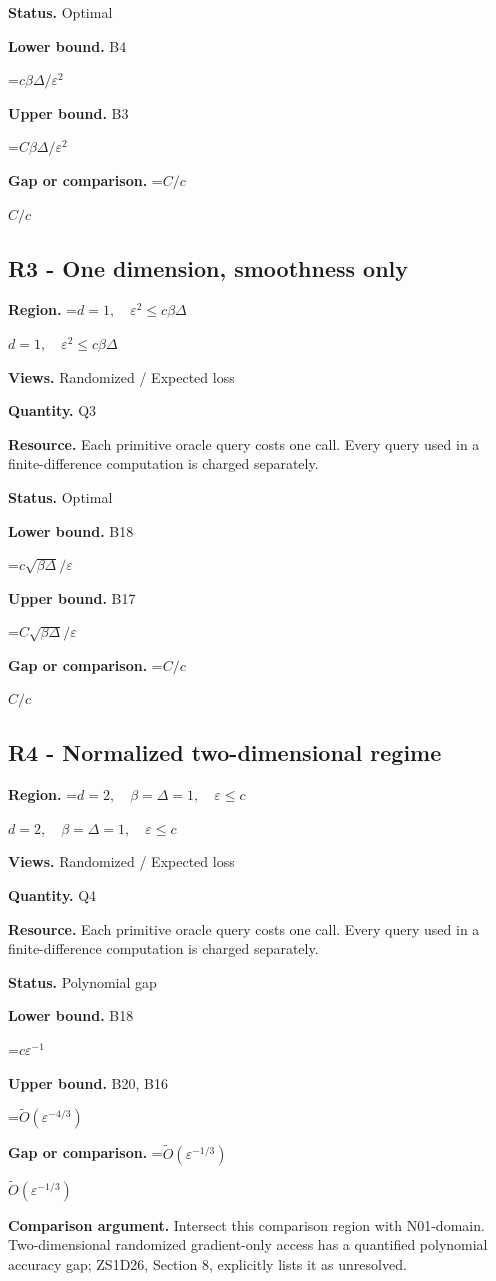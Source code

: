 \documentclass[10pt,a4paper]{article}
\newcommand{\AtlasMath}[1]{\par\begingroup\centering\setbox0=\hbox{$\displaystyle #1$}\ifdim\wd0>1.4\linewidth\typeout{ATLAS WIDE FORMULA: \the\wd0}\fi\ifdim\wd0>\linewidth\resizebox{\linewidth}{!}{\box0}\else\box0\fi\par\endgroup}
\newcommand{\AtlasInlineMath}[1]{\begingroup\setbox0=\hbox{$#1$}\ifdim\wd0>.4\linewidth\endgroup\AtlasMath{#1}\else\endgroup$#1$\fi}
\begin{document}
\textbf{Status.} Optimal

\textbf{Lower bound.} B4

\AtlasMath{c\beta\Delta/\varepsilon^2}
\textbf{Upper bound.} B3

\AtlasMath{C\beta\Delta/\varepsilon^2}
\textbf{Gap or comparison.} \AtlasInlineMath{C/c}

\subsection{R3 - One dimension, smoothness only}
\textbf{Region.} \AtlasInlineMath{d=1,\quad\varepsilon^2\le c\beta\Delta}

\textbf{Views.} Randomized / Expected loss

\textbf{Quantity.} Q3

\textbf{Resource.} Each primitive oracle query costs one call. Every query used in a finite-difference computation is charged separately.

\textbf{Status.} Optimal

\textbf{Lower bound.} B18

\AtlasMath{c\sqrt{\beta\Delta}/\varepsilon}
\textbf{Upper bound.} B17

\AtlasMath{C\sqrt{\beta\Delta}/\varepsilon}
\textbf{Gap or comparison.} \AtlasInlineMath{C/c}

\subsection{R4 - Normalized two-dimensional regime}
\textbf{Region.} \AtlasInlineMath{d=2,\quad\beta=\Delta=1,\quad\varepsilon\le c}

\textbf{Views.} Randomized / Expected loss

\textbf{Quantity.} Q4

\textbf{Resource.} Each primitive oracle query costs one call. Every query used in a finite-difference computation is charged separately.

\textbf{Status.} Polynomial gap

\textbf{Lower bound.} B18

\AtlasMath{c\varepsilon^{-1}}
\textbf{Upper bound.} B20, B16

\AtlasMath{\widetilde{O}(\varepsilon^{-4/3})}
\textbf{Gap or comparison.} \AtlasInlineMath{\widetilde{O}(\varepsilon^{-1/3})}

\textbf{Comparison argument.} Intersect this comparison region with N01-domain. Two-dimensional randomized gradient-only access has a quantified polynomial accuracy gap; ZS1D26, Section 8, explicitly lists it as unresolved.
\end{document}

